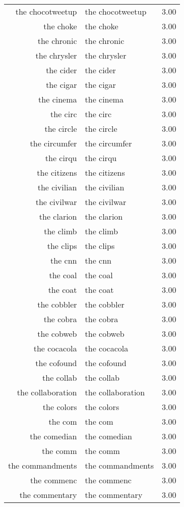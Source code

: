 \begin{table}[ht]
\begin{tabular}{rlr}
  the chocotweetup & the chocotweetup & 3.00 \\ 
  the choke & the choke & 3.00 \\ 
  the chronic & the chronic & 3.00 \\ 
  the chrysler & the chrysler & 3.00 \\ 
  the cider & the cider & 3.00 \\ 
  the cigar & the cigar & 3.00 \\ 
  the cinema & the cinema & 3.00 \\ 
  the circ & the circ & 3.00 \\ 
  the circle & the circle & 3.00 \\ 
  the circumfer & the circumfer & 3.00 \\ 
  the cirqu & the cirqu & 3.00 \\ 
  the citizens & the citizens & 3.00 \\ 
  the civilian & the civilian & 3.00 \\ 
  the civilwar & the civilwar & 3.00 \\ 
  the clarion & the clarion & 3.00 \\ 
  the climb & the climb & 3.00 \\ 
  the clips & the clips & 3.00 \\ 
  the cnn & the cnn & 3.00 \\ 
  the coal & the coal & 3.00 \\ 
  the coat & the coat & 3.00 \\ 
  the cobbler & the cobbler & 3.00 \\ 
  the cobra & the cobra & 3.00 \\ 
  the cobweb & the cobweb & 3.00 \\ 
  the cocacola & the cocacola & 3.00 \\ 
  the cofound & the cofound & 3.00 \\ 
  the collab & the collab & 3.00 \\ 
  the collaboration & the collaboration & 3.00 \\ 
  the colors & the colors & 3.00 \\ 
  the com & the com & 3.00 \\ 
  the comedian & the comedian & 3.00 \\ 
  the comm & the comm & 3.00 \\ 
  the commandments & the commandments & 3.00 \\ 
  the commenc & the commenc & 3.00 \\ 
  the commentary & the commentary & 3.00 \\ 

\end{tabular}
\end{table}
